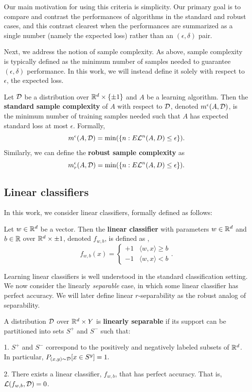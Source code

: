 Our main motivation for using this criteria is simplicity. Our primary goal is to compare and contrast the performances of algorithms in the standard and robust cases, and this contrast clearest when the performances are summarized as a single number (namely the expected loss) rather than an $(\epsilon, \delta)$ pair. 

Next, we address the notion of sample complexity. As above, sample complexity is typically defined as the minimum number of samples needed to guarantee $(\epsilon, \delta)$ performance. In this work, we will instead define it solely with respect to $\epsilon$, the expected loss. 

\begin{defn}
Let ${\mathcal D}$ be a distribution over $\mathbb R^d \times \{\pm 1\}$ and $A$ be a learning algorithm. Then the \textbf{standard sample complexity} of $A$ with respect to ${\mathcal D}$, denoted $m^\epsilon(A, {\mathcal D})$, is the minimum number of training samples needed such that $A$ has  expected standard loss at most $\epsilon$. Formally, $$m^\epsilon(A, {\mathcal D}) = \min(\{n: E\mathcal L^n(A, D) \leq \epsilon\}).$$ Similarly, we can define the \textbf{robust sample complexity} as $$m_r^\epsilon(A, {\mathcal D}) = \min(\{n: E\mathcal L^n(A, D) \leq \epsilon\}).$$
\end{defn}

\subsection{Linear classifiers}

In this work, we consider linear classifiers, formally defined as follows:
\begin{defn}
Let $w \in \mathbb R^d$ be a vector. Then the \textbf{linear classifier} with parameters $w \in \mathbb R^d$ and $b \in \mathbb R$ over $\mathbb R^d \times {\pm 1}$, denoted $f_{w, b}$, is defined as , $$f_{w,b}(x) = \begin{cases} +1 & \langle w, x \rangle  \geq b \\ -1 & \langle w, x \rangle < b  \end{cases}.$$ 
\end{defn}

Learning linear classifiers is well understood in the standard classification setting. We now consider the linearly \textit{separable} case, in which some linear classifier has perfect accuracy. We will later define linear $r$-separability as the robust analog of separability.

\begin{defn}
A distribution ${\mathcal D}$ over $\mathbb R^d \times Y$ is \textbf{linearly separable} if its support can be partitioned into sets $S^+$ and $S^-$ such that:

1. $S^+$ and $S^-$ correspond to the positively and negatively labeled subsets of $\mathbb R^d$. In particular, $P_{(x,y) \sim {\mathcal D}}[x \in S^y] = 1.$

2. There exists a linear classifier, $f_{w, b}$, that has perfect accuracy. That is, $\mathcal L(f_{w, b}, {\mathcal D}) = 0$. 
\end{defn}

